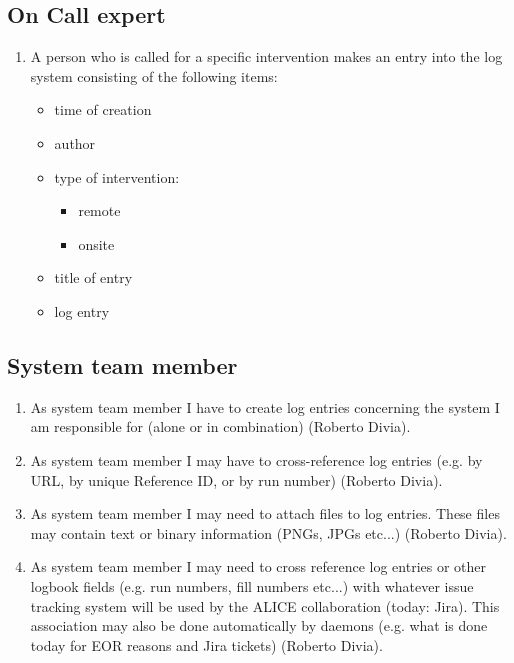 \subsection{On Call expert}
\begin{enumerate}
  \item A person who is called for a specific intervention makes an entry into the log system consisting of the following items:
  \begin{itemize}
    \item time of creation
    \item author
    \item type of intervention:
    \begin{itemize}
      \item remote
      \item onsite
    \end{itemize}
    \item title of entry
    \item log entry
  \end{itemize}
\end{enumerate}

\subsection{System team member}
\begin{enumerate}
  \item As system team member I have to create log entries concerning the system I am responsible for (alone or in combination) (Roberto Divia).
  \item As system team member I may have to cross-reference log entries (e.g. by URL, by unique Reference ID, or by run number)  (Roberto Divia).
  \item  As system team member I may need to attach files to log entries. These files may contain text or binary information (PNGs, JPGs etc...) (Roberto Divia).
  \item As system team member I may need to cross reference log entries or other logbook fields (e.g. run numbers, fill numbers etc...) with whatever issue tracking system will be used by the ALICE collaboration (today: Jira). This association may also be done automatically by daemons (e.g. what is done today for EOR reasons and Jira tickets) (Roberto Divia).
\end{enumerate}


